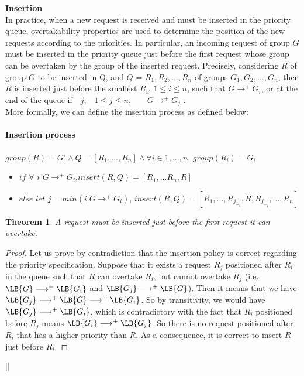\documentclass[11pt]{report}
\begin{document}
\textbf{Insertion}\\
In practice, when a new request is received and must be inserted in the priority queue, overtakability properties are used to determine the position of the new requests according to the priorities.
In particular, an incoming request of group $G$ must be inserted in the priority queue just before the first request whose group can be overtaken by the group of the inserted request. Precisely, 
considering $R$ of group $G$ to be inserted in Q, and
$Q$ = $R_1,R_2,...,R_n$ of groups $G_1,G_2,...,G_n$, then $R$ is inserted just before the smallest $R_i$, $1 \le i \le n$, such that $G\longrightarrow^{+}G_i$, or at the end of the queue if~\ \forall $j$,~\ $1 \le j \le n$,~\ \lnot~\ $G\longrightarrow^{+}G_j$ .\\
More formally, we can define the insertion process as defined below:
\paragraph{Insertion process}
$group(R)=G' \wedge Q=[R_1,...,R_n] \wedge \forall i \in 1,...,n$, $group(R_i)=G_i$
\begin{itemize}
\item $if$ $\forall$ $i$ \lnot $G\longrightarrow^{+}G_i$,$insert(R,Q)=[R_1,...R_n,R]$
\item $else$ $let$ $j=min({i|G\longrightarrow^{+}G_i})$, $insert(R, Q)=[R_1,...,R_j_-_1,R,R_j_+_1,...,R_n]$
\end{itemize} 

\newtheorem{insertion}{Theorem}
\begin{insertion}
A request must be inserted just before the first request it can overtake.
\end{insertion}
\begin{proof}[Proof]
Let us prove by contradiction that the insertion policy is correct regarding the priority specification.
Suppose that it exists a request $R_j$ positioned after  
$R_i$ in the queue such that $R$ can overtake $R_i$, but cannot overtake $R_j$ (i.e. $\LB{G}\longrightarrow^{+}\LB{G_i}$ and  $\LB{G_j}\longrightarrow^{+}\LB{G}$). Then it means that we have $\LB{G_j}\longrightarrow^{+}\LB{G}\longrightarrow^{+}\LB{G_i}$. So by transitivity, we would have $\LB{G_j}\longrightarrow^{+}\LB{G_i}$,
which is contradictory with the fact that $R_i$ positioned before $R_j$ means $\LB{G_i}\longrightarrow^{+}\LB{G_j}$. So there is no request positioned after $R_i$ that has a higher priority than $R$. As a consequence, it is correct to insert $R$ just before $R_i$.
\end{proof}[]
\end{document}
